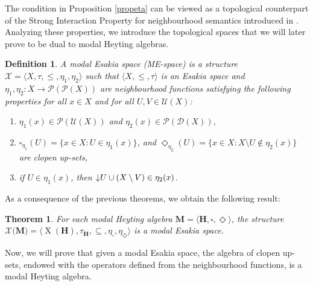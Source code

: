 \documentclass[pdflatex,sn-mathphys-num]{sn-jnl}%
\newcommand{\He}{\mathbf{H}}
\newcommand{\X}[1]{\operatorname{X}(#1)}
\newcommand{\da}[1]{\operatorname{\downarrow}\hspace{-0.5mm}{#1}}
\theoremstyle{thmstyleone}%
\newtheorem{theorem}{Theorem}%
\theoremstyle{thmstyletwo}%
\theoremstyle{thmstylethree}%
\newtheorem{definition}{Definition}%
\begin{document}

The condition in Proposition \ref{propeta} can be viewed as a topological counterpart of the Strong Interaction Property for neighbourhood semantics introduced in \cite{Oli2020}. 
Analyzing these properties, we introduce the topological spaces that we will later prove to be dual to modal Heyting algebras.

\begin{definition}\label{ME-space}
    A \emph{modal Esakia space} (ME-space) is a structure $\mathcal{X}=\langle X,\tau,\leq,\eta_1,\eta_2\rangle$ such that $\langle X,\leq,\tau\rangle$ is an Esakia space and $\eta_1,\eta_2\colon X\to \mathcal{P}(\mathcal{P}(X))$ are neighbourhood functions satisfying the following properties for all $x\in X$ and for all $U,V\in \mathcal{U}(X)$:
    \begin{enumerate}
        \item $\eta_1(x)\in \mathcal{P}(\mathcal{U}(X))$ and $\eta_2(x)\in \mathcal{P}(\mathcal{D}(X))$,
        \item $\square_{\eta_1}(U)= \{ x \in X : U \in \eta_1(x)\}$, and $\Diamond_{\eta_2}(U)=\{ x \in X : X\setminus U \notin \eta_2(x)\}$ are clopen up-sets, 
        \item  if $U\in \eta_1(x)$, then $\da{U}\cup (X\setminus V)\in \eta_2(x)$.
    \end{enumerate}
\end{definition}

As a consequence of the previous theorems, we obtain the following result:

\begin{theorem}
    For each modal Heyting algebra $\mathbf{M}=\langle \He,\square,\Diamond\rangle$, the structure $\mathcal{X}(\mathbf{M)}=\langle \X{\He},\tau_\He,\subseteq,\eta_\square,\eta_\Diamond\rangle$ is a modal Esakia space.
\end{theorem}

Now, we will prove that given a modal Esakia space, the algebra of clopen up-sets, endowed with the operators defined from the neighbourhood functions, is a modal Heyting algebra.
\end{document}
